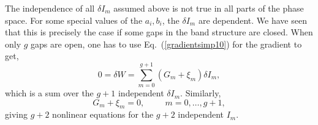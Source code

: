 \documentclass[]{revtex4-1}
\begin{document}
The independence of all $\delta I_m$ assumed above is not true in all parts of the phase space. For some special values of the $a_i,b_i$, the  $\delta I_m$ are dependent.
We have seen that this is precisely the case if some gaps in the band structure are closed. When only $g$ gaps are open, one has to use Eq.~(\ref{gradientsimp10}) for the gradient to get,
\begin{equation}
 0=\delta W = \sum_{m=0}^{g+1} (G_m+\xi_m) \delta I_m,
\end{equation}
which is a sum over the $g+1$ independent $\delta I_m$. Similarly,
\begin{equation}
  G_m
  + \xi_m =0, \hspace{1cm} m=0,\dots,g+1,
\end{equation}
giving $g+2$ nonlinear equations for the $g+2$ independent $I_m$.
\end{document}
